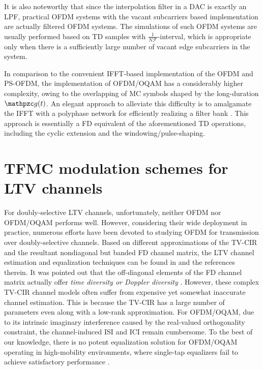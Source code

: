 \documentclass[journal]{IEEEtran}
\begin{document}
It is also noteworthy that since the interpolation filter in a DAC is exactly an LPF, practical OFDM systems with the vacant subcarriers based implementation are actually filtered OFDM systems. The simulations of such OFDM systems are usually performed based on TD samples with $\frac{1}{N\mathcal F}$-interval, which is appropriate only when there is a sufficiently large number of vacant edge subcarriers in the system.

In comparison to the convenient  IFFT-based implementation of the OFDM and PS-OFDM, the implementation of OFDM/OQAM has a considerably higher complexity, owing to the overlapping of MC symbols shaped by the long-duration $\mathpzc g(t)$.
An elegant approach to alleviate this difficulty is to amalgamate the IFFT with
a polyphase network for  efficiently realizing a filter bank \cite{ofdm_oqam_siohan_02,fbmcprimer}. This approach is  essentially a FD equivalent of the aforementioned TD operations, including the cyclic extension and the windowing/pulse-shaping.

\section{TFMC modulation schemes for LTV channels}\label{tfmc_for_ltv}
For doubly-selective LTV channels, unfortunately, neither OFDM nor OFDM/OQAM performs well.
However, considering their wide deployment in practice, numerous efforts have been devoted to studying OFDM for transmission over doubly-selective channels. Based on different approximations of the TV-CIR and the resultant nondiagonal but banded FD channel matrix, the LTV channel {estimation} and equalization techniques can be found in \cite{cimini_tcom_1985,li_tcom_1998,ici_ofdm_tcom_1999,ced_mc_tcom2001,ici_ofdm_tcom_2003,lc_eq_ofdm_tsp_2004,1291798,1315913,1381441,1413242,turbo_eq_ofdm_tsp_2008, ov_ofdm_tcom_2011} and the references therein. It was pointed out that the off-diagonal elements of the FD channel matrix actually  offer \emph{time diversity {or Doppler diversity}} \cite{ced_mc_tcom2001,ici_ofdm_tcom_2003}.
However, these complex TV-CIR channel models 
often suffer from expensive yet somewhat inaccurate channel estimation. This is because the TV-CIR has a large number of parameters even along with a low-rank approximation.
For OFDM/OQAM, due to its intrinsic imaginary interference caused by the real-valued orthogonality constraint, the channel-induced ISI and ICI remain cumbersome.
To the best of our knowledge, there is no potent equalization solution for OFDM/OQAM operating in high-mobility environments, where single-tap equalizers fail to achieve satisfactory performance \cite{nissel2017_cl}.
\end{document}
